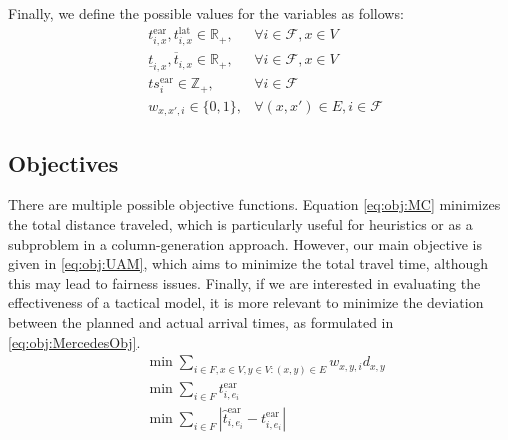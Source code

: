 \documentclass[../../thesis.tex]{subfiles}
\begin{document}
Finally, we define the possible values for the variables as follows:
\begin{align}
    &t^\text{ear}_{i,x},t^\text{lat}_{i,x} \in \mathbb{R}_{+}, &\forall i\in \mathcal{F}, x\in V \nonumber \\
    &\underline{t}_{i,x},\overline{t}_{i,x} \in \mathbb{R}_{+}, &\forall i\in \mathcal{F}, x\in V \nonumber \\
    &ts^\text{ear}_i \in \mathbb{Z}_{+}, &\forall i\in \mathcal{F} \nonumber\\
    &w_{x,x',i} \in \{0,1\}, &\forall (x,x')\in E, i\in \mathcal{F} \nonumber
\end{align}

\subsection{Objectives}
There are multiple possible objective functions. Equation \eqref{eq:obj:MC} minimizes the total distance traveled, which is particularly useful for heuristics or as a subproblem in a column-generation approach.
However, our main objective is given in \eqref{eq:obj:UAM}, which aims to minimize the total travel time, although this may lead to fairness issues.
Finally, if we are interested in evaluating the effectiveness of a tactical model, it is more relevant to minimize the deviation between the planned and actual arrival times, as formulated in \eqref{eq:obj:MercedesObj}.
\begin{align}
    &\min \sum_{i \in F,x \in V,y \in V:(x,y)\in E} w_{x,y,i}d_{x,y} \label{eq:obj:MC}\\
    &\min \sum_{i\in F} t^\text{ear}_{i,e_{i}}\label{eq:obj:UAM}\\
    &\min \sum_{i\in F} |\hat t^\text{ear}_{i,e_{i}} - t^\text{ear}_{i,e_{i}}|\label{eq:obj:MercedesObj}
\end{align}
\end{document}
